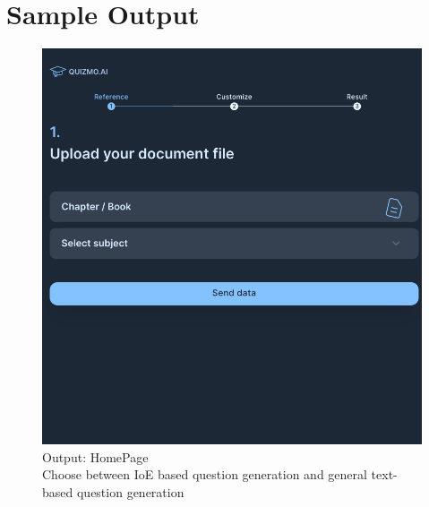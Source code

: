 \documentclass[12pt]{report}
\begin{document}
\section{Sample Output}
\begin{figure}[ht!]
    \centering
    \includegraphics[scale = 0.3]{Images/Page1.png}
    \captionsetup{justification=centering} 
    \caption{Output: HomePage \\ Choose between IoE based question generation and general text-based question generation}
\end{figure}
\end{document}

